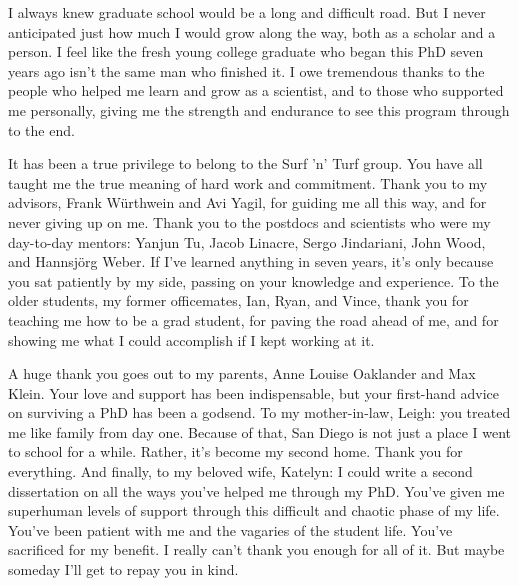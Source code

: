 \begin{frontmatter}
%
\tableofcontents
\listoffigures  %
\listoftables   %



%
%
\begin{acknowledgements}
I always knew graduate school would be a long and difficult road. But I
never anticipated just how much I would grow along the way, both
as a scholar and a person. I feel like the fresh young college
graduate who began this PhD seven years ago isn't the same man who
finished it. I owe tremendous thanks to the people who helped me learn
and grow as a scientist, and to those who
supported me personally, giving me the strength and endurance to see
this program through to the end.

It has been a true privilege to belong to the Surf 'n' Turf
group. You have all taught me the true meaning of hard work and
commitment. Thank you to my advisors, Frank W\"{u}rthwein and Avi
Yagil, for guiding me all this way, and for never giving up on
me. Thank you to the postdocs and scientists who were my day-to-day
mentors: Yanjun Tu, Jacob Linacre, Sergo Jindariani, John Wood, and
Hannsj\"{o}rg Weber. If I've learned anything in seven years, it's
only because you sat patiently by my side, passing on your knowledge
and experience. To the older students, my former officemates, Ian,
Ryan, and Vince, thank you for teaching me how to be a grad student,
for paving the road ahead of me, and for showing me
what I could accomplish if I kept working at it.

A huge thank you goes out to my parents, Anne Louise Oaklander and Max
Klein. Your love and support has been indispensable, but your
first-hand advice on surviving a PhD has been a godsend.
To my mother-in-law, Leigh: you treated me like family from day one.
Because of that, San Diego is not just a place I went to
school for a while. Rather, it's become my second home. Thank you for everything.
And finally, to my beloved wife, Katelyn: I could write a second
dissertation on all the ways you've helped me through my PhD.
You've given me superhuman levels of support through this difficult
and chaotic phase of my life. You've been patient with me and the
vagaries of the student life. You've sacrificed for my benefit. I
really can't thank you enough for all of it. But maybe someday
I'll get to repay you in kind.


\end{acknowledgements}
\end{frontmatter}
